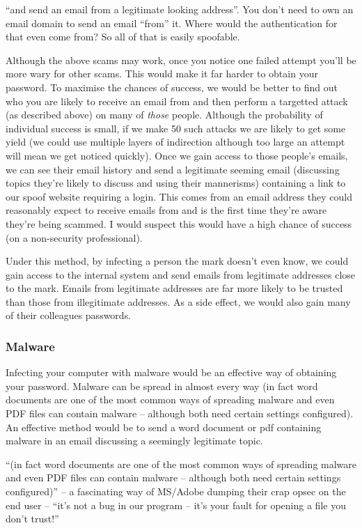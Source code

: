\documentclass[10pt,\jkfside,a4paper]{article}
\begin{document}
\begin{enumerate}
{\color{blue} ``and send an email from a legitimate looking address''. You don't need to own an email domain to
send an email ``from'' it. Where would the authentication for that even come from? So all of that is easily spoofable.}

Although the above scams may work, once you notice one failed attempt you'll be more wary for other scams.
This would make it far harder to obtain your password. To maximise the chances of 
success, we would be better to find out who you are likely to receive an email from and 
then perform a targetted attack (as described above) on many of \textit{those} people. 
Although the probability of individual success is small, if we make 50 such attacks we are likely 
to get some yield (we could use multiple layers of indirection although too large an attempt will 
mean we get noticed quickly). Once we gain access to those people's emails, we can see their email 
history and send a legitimate seeming email (discussing topics they're likely to discuss and using 
their mannerisms) containing a link to our spoof website requiring a login. This comes from an email 
address they could reasonably expect to receive emails from and is the first time they're aware they're 
being scammed. I would suspect this would have a high chance of success (on a non-security professional).

Under this method, by infecting a person the mark doesn't even know, we could gain access to the internal 
system and send emails from legitimate addresses close to the mark. Emails from legitimate addresses 
are far more likely to be trusted than those from illegitimate addresses. As a 
side effect, we would also gain many of their colleagues passwords.

\subsubsection*{Malware}

Infecting your computer with malware would be an effective way of obtaining your password. Malware 
can be spread in almost every way (in fact word documents are one of the most common ways of spreading 
malware and even PDF files can contain malware -- although both need certain settings configured). An 
effective method would be to send a word document or pdf containing malware in an email discussing a 
seemingly legitimate topic.

{\color{blue} ``(in fact word documents are one of the most common ways of spreading
malware and even PDF files can contain malware -- although both need certain settings configured)'' -- a fascinating
way of MS/Adobe dumping their crap opsec on the end user -- ``it's not a bug in our program -- it's your fault
for opening a file you don't trust!''}


\end{enumerate}
\end{document}
